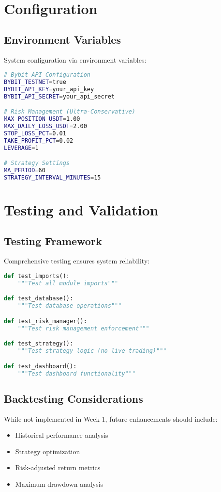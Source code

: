 \documentclass[12pt,a4paper]{article}
\begin{document}
\section{Configuration}

\subsection{Environment Variables}
System configuration via environment variables:

\begin{lstlisting}[language=bash, caption=Environment Configuration]
# Bybit API Configuration
BYBIT_TESTNET=true
BYBIT_API_KEY=your_api_key
BYBIT_API_SECRET=your_api_secret

# Risk Management (Ultra-Conservative)
MAX_POSITION_USDT=1.00
MAX_DAILY_LOSS_USDT=2.00
STOP_LOSS_PCT=0.01
TAKE_PROFIT_PCT=0.02
LEVERAGE=1

# Strategy Settings
MA_PERIOD=60
STRATEGY_INTERVAL_MINUTES=15
\end{lstlisting}

\section{Testing and Validation}

\subsection{Testing Framework}
Comprehensive testing ensures system reliability:

\begin{lstlisting}[language=Python, caption=Test Coverage]
def test_imports():
    """Test all module imports"""

def test_database():
    """Test database operations"""

def test_risk_manager():
    """Test risk management enforcement"""

def test_strategy():
    """Test strategy logic (no live trading)"""

def test_dashboard():
    """Test dashboard functionality"""
\end{lstlisting}

\subsection{Backtesting Considerations}
While not implemented in Week 1, future enhancements should include:

\begin{itemize}
\item Historical performance analysis
\item Strategy optimization
\item Risk-adjusted return metrics
\item Maximum drawdown analysis
\end{itemize}
\end{document}
